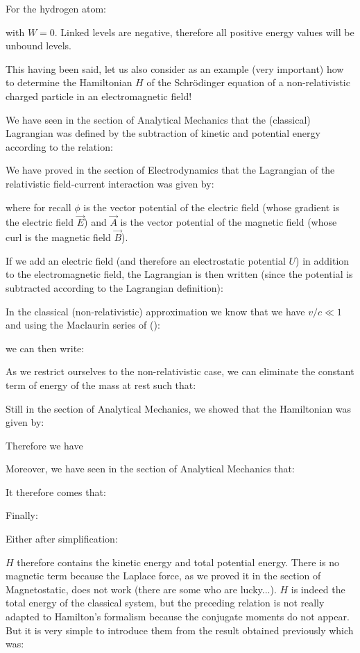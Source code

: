 	For the hydrogen atom:
	
	with $W=0$. Linked levels are negative, therefore all positive energy values will be unbound levels.
	
	This having been said, let us also consider as an example (very important) how to determine the Hamiltonian $H$ of the Schrödinger equation of a non-relativistic charged particle in an electromagnetic field!

	We have seen in the section of Analytical Mechanics that the (classical) Lagrangian was defined by the subtraction of kinetic and potential energy according to the relation:
	
	We have proved in the section of Electrodynamics that the Lagrangian of the relativistic field-current interaction was given by:
	
	where for recall $\phi$ is the vector potential of the electric field (whose gradient is the electric field $\vec{E}$) and $\vec{A}$ is the vector potential of the magnetic field (whose curl is the magnetic field $\vec{B}$).

	If we add an electric field (and therefore an electrostatic potential $U$) in addition to the electromagnetic field, the Lagrangian is then written (since the potential is subtracted according to the Lagrangian definition):
	
	In the classical (non-relativistic) approximation we know that we have $v/c \ll 1$ and using the Maclaurin series of ():
	
	we can then write:
	
	As we restrict ourselves to the non-relativistic case, we can eliminate the constant term of energy of the mass at rest such that:
	
	Still in the section of Analytical Mechanics, we showed that the Hamiltonian was given by:
	
	Therefore we have
	
	Moreover, we have seen in the section of Analytical Mechanics that:
	
	It therefore comes that:
	
	Finally:
	
	Either after simplification:
	
	$H$ therefore contains the kinetic energy and total potential energy. There is no magnetic term because the Laplace force, as we proved it in the section of Magnetostatic, does not work (there are some who are lucky...). $H$ is indeed the total energy of the classical system, but the preceding relation is not really adapted to Hamilton's formalism because the conjugate moments do not appear. But it is very simple to introduce them from the result obtained previously which was:
	
